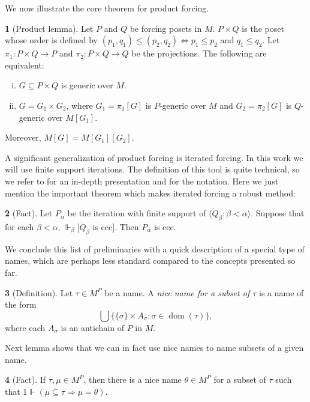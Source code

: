 \documentclass[11pt,a4paper]{report}
\theoremstyle{definition}
\theoremstyle{num.custom-title}
\theoremstyle{custom-title}
\newtheorem*{teo_custom-title_nonum}{}
\DeclareMathOperator{\dom}{dom}
\DeclareMathOperator{\imp}{\Rightarrow}
\DeclareMathOperator{\sse}{\subseteq}
\renewcommand{\iff}{\Leftrightarrow}
\newcommand{\forces}{\Vdash}
\begin{document}
We now illustrate the core theorem for product forcing.

\begin{teo_custom-title_nonum}[Product lemma] \label{lemma-product_lemma}
Let $P$ and $Q$ be forcing posets in $M$. $P \times Q$ is the poset whose order is defined by $(p_1,q_1) \leq (p_2,q_2) \iff p_1 \leq p_2$ and $q_1 \leq q_2$. Let $\pi_1 \colon P \times Q \to P$ and $\pi_2 \colon P \times Q \to Q$ be the projections. The following are equivalent:
\begin{enumerate}[(i)]
\item $G \sse P \times Q$ is generic over $M$.
\item $G = G_1 \times G_2$, where $G_1 = \pi_1[G]$ is $P$-generic over $M$ and $G_2 = \pi_2[G]$ is $Q$-generic over $M[G_1]$.
\end{enumerate}
Moreover, $M[G] = M[G_1][G_2]$.
\end{teo_custom-title_nonum}

A significant generalization of product forcing is iterated forcing. In this work we will use finite support iterations. The definition of this tool is quite technical, so we refer to \cite{Kun2013} for an in-depth presentation and for the notation. Here we just mention the important theorem which makes iterated forcing a robust method:

\begin{teo_custom-title_nonum}[Fact]
Let $P_\alpha$ be the iteration with finite support of $\langle \dot{Q}_\beta : \beta < \alpha \rangle$. Suppose that for each $\beta < \alpha$, $\forces_\beta [\dot{Q}_\beta$ is ccc$]$. Then $P_\alpha$ is ccc.
\end{teo_custom-title_nonum}

We conclude this list of preliminaries with a quick description of a special type of names, which are perhaps less standard compared to the concepts presented so far.

\begin{teo_custom-title_nonum}[Definition]
Let $\tau \in M^P$ be a name. A \emph{nice name for a subset of $\tau$} is a name of the form
\[
\bigcup \big\{ \{\sigma\} \times A_\sigma : \sigma \in \dom(\tau) \big\},
\]
where each $A_\sigma$ is an antichain of $P$ in $M$.
\end{teo_custom-title_nonum}

Next lemma shows that we can in fact use nice names to name subsets of a given name.

\begin{teo_custom-title_nonum}[Fact]\label{lemma-nice_names_exist}
If $\tau, \mu \in M^P$, then there is a nice name $\theta \in M^P$ for a subset of $\tau$ such that $1 \forces (\mu \sse \tau \imp \mu = \theta)$.
\end{teo_custom-title_nonum}
\end{document}
